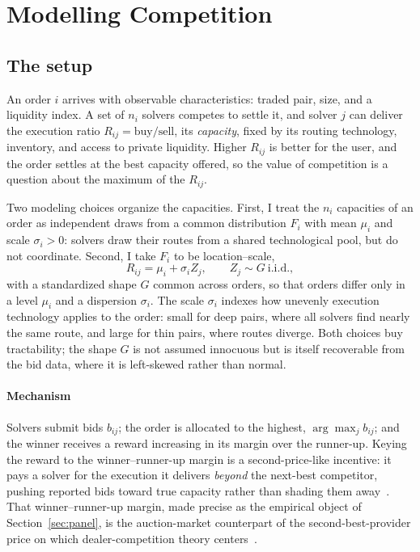 \documentclass[11pt]{article}
\theoremstyle{plain}
\theoremstyle{definition}
\theoremstyle{remark}
\begin{document}
\section{Modelling Competition}

\subsection{The setup}\label{sec:model-setup}
An order $i$ arrives with observable characteristics: traded pair, size, and a liquidity index. A set of $n_i$ solvers competes to settle it, and solver $j$ can deliver the execution ratio $R_{ij}=\text{buy}/\text{sell}$, its \emph{capacity}, fixed by its routing technology, inventory, and access to private liquidity. Higher $R_{ij}$ is better for the user, and the order settles at the best capacity offered, so the value of competition is a question about the maximum of the $R_{ij}$.

Two modeling choices organize the capacities. First, I treat the $n_i$ capacities of an order as independent draws from a common distribution $F_i$ with mean $\mu_i$ and scale $\sigma_i>0$: solvers draw their routes from a shared technological pool, but do not coordinate. Second, I take $F_i$ to be location--scale,
\begin{equation}\label{eq:capacity}
R_{ij}=\mu_i+\sigma_i Z_j,\qquad Z_j\sim G\ \text{i.i.d.},
\end{equation}
with a standardized shape $G$ common across orders, so that orders differ only in a level $\mu_i$ and a dispersion $\sigma_i$. The scale $\sigma_i$ indexes how unevenly execution technology applies to the order: small for deep pairs, where all solvers find nearly the same route, and large for thin pairs, where routes diverge. Both choices buy tractability; the shape $G$ is not assumed innocuous but is itself recoverable from the bid data, where it is left-skewed rather than normal.

\paragraph{Mechanism} Solvers submit bids $b_{ij}$; the order is allocated to the highest, $\arg\max_j b_{ij}$; and the winner receives a reward increasing in its margin over the runner-up. Keying the reward to the winner--runner-up margin is a second-price-like incentive: it pays a solver for the execution it delivers \emph{beyond} the next-best competitor, pushing reported bids toward true capacity rather than shading them away~\citep{vickrey1961counterspeculation}. That winner--runner-up margin, made precise as the empirical object of Section~\ref{sec:panel}, is the auction-market counterpart of the second-best-provider price on which dealer-competition theory centers~\citep{ho1983dynamics}.
\end{document}
